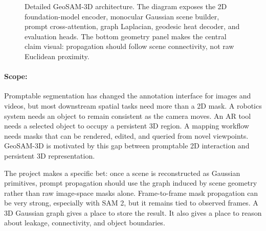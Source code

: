 \documentclass{article}
\makeatletter
\renewcommand{\scriptsize}{\@setfontsize\scriptsize\@viipt\@viiipt}
\renewcommand{\tiny}{\@setfontsize\tiny\@vipt\@viipt}
\makeatother
\begin{document}
\begin{figure}[t]
\caption{Detailed GeoSAM-3D architecture. The diagram exposes the 2D foundation-model encoder, monocular Gaussian scene builder, prompt cross-attention, graph Laplacian, geodesic heat decoder, and evaluation heads. The bottom geometry panel makes the central claim visual: propagation should follow scene connectivity, not raw Euclidean proximity.}
\label{fig:geosam-architecture}
\end{figure}

\paragraph{Scope:}

Promptable segmentation has changed the annotation interface for images and videos, but most downstream spatial tasks need more than a 2D mask. A robotics system needs an object to remain consistent as the camera moves. An AR tool needs a selected object to occupy a persistent 3D region. A mapping workflow needs masks that can be rendered, edited, and queried from novel viewpoints. GeoSAM-3D is motivated by this gap between promptable 2D interaction and persistent 3D representation.

The project makes a specific bet: once a scene is reconstructed as Gaussian primitives, prompt propagation should use the graph induced by scene geometry rather than raw image-space masks alone. Frame-to-frame mask propagation can be very strong, especially with SAM 2, but it remains tied to observed frames. A 3D Gaussian graph gives a place to store the result. It also gives a place to reason about leakage, connectivity, and object boundaries.
\end{document}
